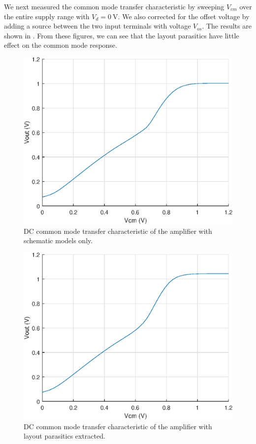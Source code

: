 \documentclass[journal,hidelinks]{IEEEtran}
\begin{document}
We next measured the common mode transfer characteristic by sweeping $V_{cm}$ over the entire supply range with $V_d = \SI{0}{\volt}$. We also corrected for the offset voltage by adding a source between the two input terminals with voltage $V_{os}$. The results are shown in . From these figures, we can see that the layout parasitics have little effect on the common mode response.

\begin{figure}[!htb]
  \centering
  \includegraphics[width=\columnwidth]{figures/schematic/dc_cm.eps}
  \caption{DC common mode transfer characteristic of the amplifier with schematic models only.}
  \label{fig:sch_dc_cm}
\end{figure}

\begin{figure}[!htb]
  \centering
  \includegraphics[width=\columnwidth]{figures/layout/dc_cm.eps}
  \caption{DC common mode transfer characteristic of the amplifier with layout parasitics extracted.}
  \label{fig:lay_dc_cm}
\end{figure}
\end{document}

